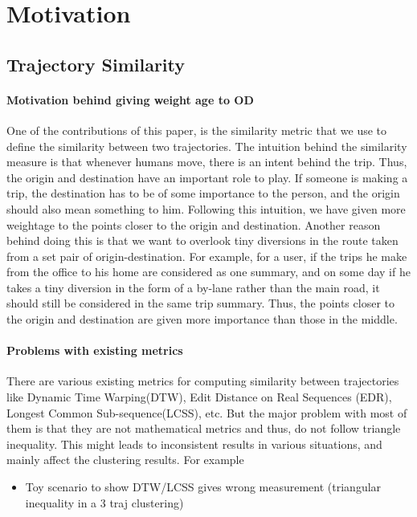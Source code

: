 \section{Motivation}

\subsection{Trajectory Similarity}

\paragraph{Motivation  behind giving weight age to OD }

\par One of the contributions of this paper, is the similarity metric that we use to define the similarity between two trajectories. The intuition behind the similarity measure is that whenever humans move, there is an intent behind the trip. Thus, the origin and destination have an important role to play. If someone is making a trip, the destination has to be of some importance to the person, and the origin should also mean something to him. Following this intuition, we have given more weightage to the points closer to the origin and destination. Another reason behind doing this is that we want to overlook tiny diversions in the route taken from a set pair of origin-destination. For example, for a user, if the trips he make from the office to his home are considered as one summary, and on some day if he takes a tiny diversion in the form of a by-lane rather than the main road, it should still be considered  in the same trip summary. Thus, the points closer to the origin and destination are given more importance than those in the middle. 

\paragraph{ Problems with existing metrics}

\par There are various existing metrics for computing similarity between trajectories like  Dynamic Time Warping(DTW), Edit Distance on Real Sequences (EDR), Longest Common Sub-sequence(LCSS), etc.  But the major problem with most of them is that they are not mathematical metrics and thus, do not follow triangle inequality. This might leads to inconsistent results in various situations, and mainly affect the clustering results. For example 
\begin{itemize}
  \item Toy scenario to show DTW/LCSS gives wrong measurement (triangular inequality in a 3 traj clustering)
\end{itemize}
